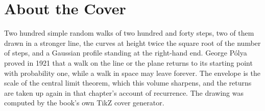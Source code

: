 \backmatter
\cleardoublepage
\chapter*{About the Cover}
\noindent Two hundred simple random walks of two hundred and forty steps, two of them drawn in a stronger line, the curves at height twice the square root of the number of steps, and a Gaussian profile standing at the right-hand end. George Pólya proved in 1921 that a walk on the line or the plane returns to its starting point with probability one, while a walk in space may leave forever. The envelope is the scale of the central limit theorem, which this volume sharpens, and the returns are taken up again in that chapter's account of recurrence. The drawing was computed by the book's own TikZ cover generator.
